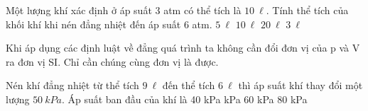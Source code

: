 \begin{vidu} %
	Một lượng khí xác định ở áp suất 3 atm có thể tích là $10\ \ell$. Tính thể tích của khối khí khi nén đẳng nhiệt đến áp suất 6 atm.
	\choice
	{\True $5\ \ell$}
	{$10\ \ell$}
	{$20\ \ell$}
	{$3\ \ell$}
	
	\begin{note}
		Khi áp dụng các định luật về đẳng quá trình ta không cần đổi đơn vị của p và V ra đơn vị SI. Chỉ cần chúng cùng đơn vị là được.
	\end{note}
\end{vidu}

\begin{vidu} %
	Nén khí đẳng nhiệt từ thể tích $9\ \ell$  đến thể tích $6\ \ell$  thì áp suất khí thay đổi một lượng $50\ kPa$. Áp suất ban đầu của khí là	
	\choice
	{40 kPa}
	{ kPa}
	{60 kPa}
	{80 kPa}
	
\end{vidu}

